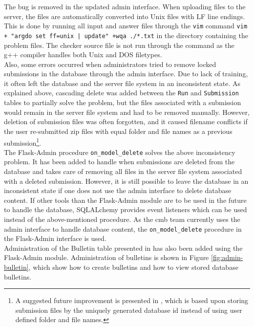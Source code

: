 The bug is removed in the updated admin interface. When uploading files to the server, the files are automatically converted into Unix files with LF line endings. This is done by running all input and answer files through the \texttt{vim} \cite{VIM} command \texttt{vim + "argdo set ff=unix | update" +wqa ./*.txt} in the directory containing the problem files. The checker source file is not run through the command as the g++ compiler handles both Unix and DOS filetypes. \\

Also, some errors occurred when administrators tried to remove locked submissions in the database through the admin interface. Due to lack of training, it often left the database and the server file system in an inconsistent state. As explained above, cascading delete was added between the \texttt{Run} and \texttt{Submission} tables to partially solve the problem, but the files associated with a submission would remain in the server file system and had to be removed manually. However, deletion of submission files was often forgotten, and it caused filename conflicts if the user re-submitted zip files with equal folder and file names as a previous submission\footnote{A suggested future improvement is presented in , which is based upon storing submission files by the uniquely generated database id instead of using user defined folder and file names.}.\\

The Flask-Admin \cite{FLASKADMIN} procedure \texttt{on\_model\_delete} solves the above inconsistency problem. It has been added to handle when submissions are deleted from the database and takes care of removing all files in the server file system associated with a deleted submission. However, it is still possible to leave the database in an inconsistent state if one does not use the admin interface to delete database content. If other tools than the Flask-Admin module are to be used in the future to handle the database, SQLALchemy provides event listeners which can be used instead of the above-mentioned procedure. As the \gls{cmb} team currently uses the admin interface to handle database content, the \texttt{on\_model\_delete} procedure in the Flask-Admin interface is used. \\

Administration of the Bulletin table presented in  has also been added using the Flask-Admin module. Administration of bulletins is shown in Figure \ref{fig:admin-bulletin}, which show how to create bulletins and how to view stored database bulletins.

